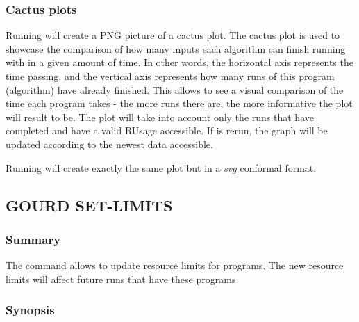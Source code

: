 \documentclass[a4paper,english]{article}
\begin{document}
\begin{adjustwidth}{18pt}{0pt}
            \subsubsection{Cactus plots}
                Running    will create a PNG picture of
                a cactus plot.
                The cactus plot is used to showcase the comparison of how many inputs each algorithm
                can finish running with in a given amount of time.
                In other words, the horizontal axis represents the time passing, and the vertical axis
                represents how many runs of this program (algorithm) have already finished.
                This allows to see a visual comparison of the time each program takes - the more runs
                there are, the more informative the plot will result to be.
                The plot will take into account only the runs that have completed and have a valid
                RUsage accessible. If   is rerun, the graph will be updated
                according to the newest data accessible.

                Running    will create exactly the same
                plot but in a \emph{svg} conformal format.

        \subsection{GOURD SET-LIMITS}

            \subsubsection{Summary}
                The   command allows to update resource limits for programs.
                The new resource limits will affect future runs that have these programs.

            \subsubsection{Synopsis}
                 


\end{adjustwidth}
\end{document}
